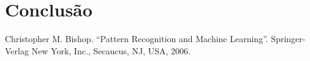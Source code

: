 \documentclass[conference]{IEEEtran}
\begin{document}

\section{Conclusão} \label{sec:conc}


\begin{thebibliography}{00}
 Christopher M. Bishop. ``Pattern Recognition and Machine Learning''. Springer-Verlag New York, Inc., Secaucus, NJ, USA, 2006.
\end{thebibliography}
\end{document}

